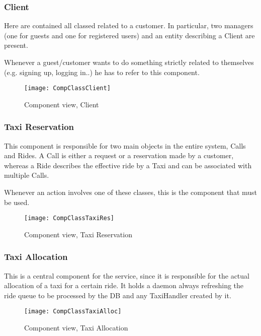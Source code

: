 \subsubsection{Client} %
Here are contained all classed related to a customer. In particular, two managers 
(one for guests and one for registered users) and an entity describing a Client are present. 

Whenever a guest/customer wants to do something strictly related to themselves 
(e.g. signing up, logging in..) he has to refer to this component.

\begin{figure}[H]
    \centering
    \texttt{[image: CompClassClient]}
    \caption{Component view, Client}
    \label{fig:compclassclient}
\end{figure}
        
\pagebreak
\subsubsection{Taxi Reservation} %
This component is responsible for two main objects in the entire system, Calls and Rides. 
A Call is either a request or a reservation made by a customer, whereas a Ride describes 
the effective ride by a Taxi and can be associated with multiple Calls. 

Whenever an action involves one of these classes, this is the component that must be used.
\vfill
\begin{figure}[H]
    \centering
    \texttt{[image: CompClassTaxiRes]}
    \caption{Component view, Taxi Reservation}
    \label{fig:compclasstaxires}
\end{figure}
\vfill
        
\pagebreak
\subsubsection{Taxi Allocation} %
This is a central component for the service, since it is responsible for the actual 
allocation of a taxi for a certain ride. It holds a daemon always refreshing 
the ride queue to be processed by the DB and any TaxiHandler created by it.


\begin{figure}[H]
    \centering
    \texttt{[image: CompClassTaxiAlloc]}
    \caption{Component view, Taxi Allocation}
    \label{fig:compclasstaxialloc}
\end{figure}

